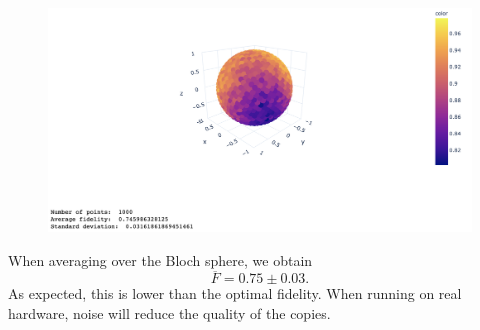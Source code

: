 \documentclass[11p]{article}
\begin{document}
\begin{figure}[H]
    \centering
            \includegraphics[totalheight=6cm]{Figures/starmon(-1,1)_F.png}
        \label{fig:2a}
\end{figure}
When averaging over the Bloch sphere, we obtain
\[
    \overline{F}=0.75 \pm 0.03.
\]
As expected, this is lower than the optimal fidelity. When running on real hardware, noise will reduce the quality of the copies.
\end{document}

